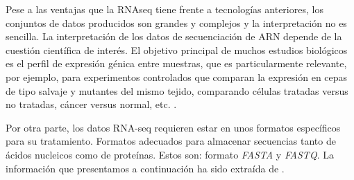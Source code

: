 
Pese a las ventajas que la RNA\-seq tiene frente a tecnologías anteriores, los conjuntos de datos producidos son grandes y complejos y la interpretación
no es sencilla. La interpretación de los datos de secuenciación de ARN depende de la cuestión científica de interés. El objetivo principal de muchos 
estudios biológicos es el perfil de expresión génica entre muestras, que es particularmente relevante, por ejemplo, para experimentos controlados 
que comparan la expresión en cepas de tipo salvaje y mutantes del mismo tejido, comparando células tratadas versus no tratadas, cáncer versus normal, etc. \cite{transcriptomics-2-RNA-seq-3}. \newline

Por otra parte, los datos RNA-seq requieren estar en unos formatos específicos para su tratamiento. Formatos adecuados para almacenar secuencias tanto
de ácidos nucleicos como de proteínas. Estos son: formato \textit{FASTA} y \textit{FASTQ}. La información que presentamos a continuación ha sido extraída de \cite{Ayala2023}.

